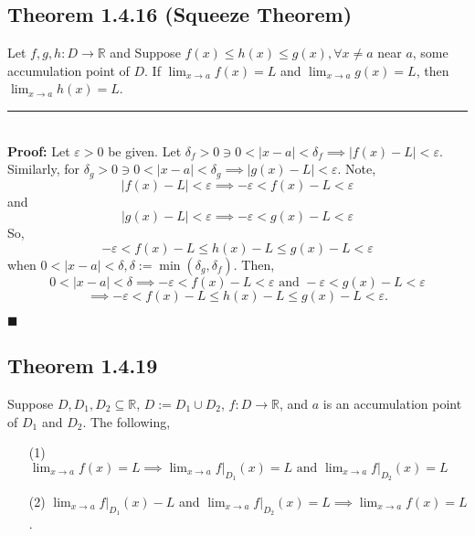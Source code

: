 \documentclass[11pt]{book}
\newcommand{\R}{\mathbb{R}}
\newcommand{\horline}{\noindent\rule{14.25cm}{0.6pt}\\}
\newcommand{\QED}{\begin{flushright}$\blacksquare$\end{flushright}}
\begin{document}
	\subsection{Theorem 1.4.16 (Squeeze Theorem)}
		\begin{theor}
			Let $f,g,h:D \to \R$ and Suppose $f(x) \leq h(x) \leq g(x), \forall x \neq a$ near $a$, some accumulation point of $D$. If $\displaystyle\lim_{x \to a}
			{f(x) = L}$ and $\displaystyle\lim_{x \to a}{g(x) = L}$, then $\displaystyle\lim_{x \to a}{h(x) = L}$.\\
			\horline
			\textbf{Proof:} Let $\varepsilon>0$ be given. Let $\delta_f > 0 \ni 0 < |x-a| < \delta_f \implies |f(x) - L| < \varepsilon$. Similarly, for $\delta_g >
			0 \ni 0 < |x-a| < \delta_g \implies | g(x) - L| < \varepsilon$. Note, $$|f(x) - L| < \varepsilon \implies -\varepsilon < f(x) - L < \varepsilon$$ and
			$$|g(x) - L| < \varepsilon \implies -\varepsilon < g(x) - L < \varepsilon$$ So, $$-\varepsilon < f(x) - L \leq h(x) - L \leq g(x) - L < \varepsilon$$
			when $0 < |x - a| < \delta, \delta := \min(\delta_g, \delta_f)$. Then, $$0<|x - a| < \delta \implies -\varepsilon < f(x) - L < \varepsilon \text{ and }
			-\varepsilon < g(x) - L < \varepsilon$$ $$\implies -\varepsilon < f(x) - L \leq h(x) - L \leq g(x) - L < \varepsilon.$$ 
			\QED
		\end{theor}
	\subsection{Theorem 1.4.19}
		\begin{theor}
			Suppose $D, D_1, D_2 \subseteq \R$, $D := D_1 \cup D_2$, $f:D \to \R$, and $a$ is an accumulation point of $D_1$ and $D_2$. The following,
			\begin{enumerate}
				\item[(1)] $\displaystyle\lim_{x \to a}{f(x) = L} \implies \displaystyle\lim_{x \to a}{f\Big|_{D_1}(x) = L} \text{ and } \displaystyle\lim_{x \to a}
					{f\Big|_{D_2}(x) = L}$
				\item[(2)] $\displaystyle\lim_{x \to a}{f\Big|_{D_1}(x) - L}$ and $\displaystyle\lim_{x \to a}{f\Big|_{D_2}(x) = L} \implies \displaystyle
					\lim_{x \to a}{f(x) = L}$.
			\end{enumerate}
		\end{theor}
		\newpage
\end{document}
